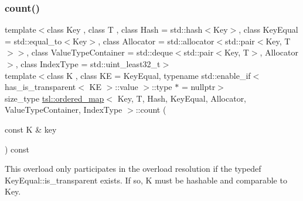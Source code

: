 \subsubsection{\texorpdfstring{count()}{count()}\hspace{0.1cm}{\footnotesize\ttfamily [2/3]}}
{\footnotesize\ttfamily template$<$class Key , class T , class Hash  = std\+::hash$<$\+Key$>$, class Key\+Equal  = std\+::equal\+\_\+to$<$\+Key$>$, class Allocator  = std\+::allocator$<$std\+::pair$<$\+Key, T$>$$>$, class Value\+Type\+Container  = std\+::deque$<$std\+::pair$<$\+Key, T$>$, Allocator$>$, class Index\+Type  = std\+::uint\+\_\+least32\+\_\+t$>$ \\
template$<$class K , class KE  = Key\+Equal, typename std\+::enable\+\_\+if$<$ has\+\_\+is\+\_\+transparent$<$ K\+E $>$\+::value $>$\+::type $\ast$  = nullptr$>$ \\
size\+\_\+type \mbox{\hyperlink{classtsl_1_1ordered__map}{tsl\+::ordered\+\_\+map}}$<$ Key, T, Hash, Key\+Equal, Allocator, Value\+Type\+Container, Index\+Type $>$\+::count (\begin{DoxyParamCaption}\item[{const K \&}]{key }\end{DoxyParamCaption}) const\hspace{0.3cm}{\ttfamily [inline]}}

This overload only participates in the overload resolution if the typedef Key\+Equal\+::is\+\_\+transparent exists. If so, K must be hashable and comparable to Key. \mbox{\label{classtsl_1_1ordered__map_a7c474b66697735313d9da8f5b238f6da}} 

